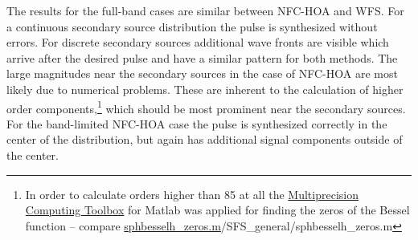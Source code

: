 The results for the full-band cases are similar
between \ac{NFC-HOA} and \ac{WFS}. For a continuous secondary source distribution the
pulse is synthesized without errors.
For discrete secondary sources additional wave fronts
are visible which arrive after the desired pulse and have a similar pattern for
both methods.
The large magnitudes near the secondary sources in the case of \ac{NFC-HOA} are
most likely due to numerical problems. These are inherent to the calculation of
higher order components,\footnote{In order to calculate orders higher than 85 at
all the \href{http://www.advanpix.com/}{\color{link}Multiprecision Computing
Toolbox}
for
Matlab was applied for finding the zeros of the Bessel function -- compare
\url{sphbesselh\_zeros.m}{\SFS/SFS\_general/sphbesselh\_zeros.m}}
which should be most prominent near the
secondary sources.
For the band-limited \ac{NFC-HOA} case the pulse is synthesized
correctly in the center of the distribution, but again has additional signal
components outside of the center.

